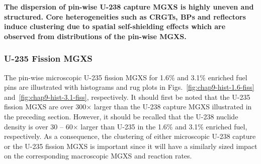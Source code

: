 
\begin{emphbox}
\textbf{The dispersion of pin-wise U-238 capture \ac{MGXS} is highly uneven and structured. Core heterogeneities such as \acp{CRGT}, \acp{BP} and reflectors induce clustering due to spatial self-shielding effects which are observed from distributions of the pin-wise \ac{MGXS}.}
\end{emphbox}

\subsubsection{U-235 Fission MGXS}
\label{subsubsec:chap9-histograms-fiss}

The pin-wise microscopic U-235 fission \ac{MGXS} for 1.6\% and 3.1\% enriched fuel pins are illustrated with histograms and rug plots in Figs.~\ref{fig:chap9-hist-1.6-fiss} and~\ref{fig:chap9-hist-3.1-fiss}, respectively. It should first be noted that the U-235 fission \ac{MGXS} are over 300$\times$ larger than the U-238 capture \ac{MGXS} illustrated in the preceding section. However, it should be recalled that the U-238 nuclide density is over 30 -- 60$\times$ larger than U-235 in the 1.6\% and 3.1\% enriched fuel, respectively. As a consequence, the clustering of either microscopic U-238 capture or the U-235 fission \ac{MGXS} is important since it will have a similarly sized impact on the corresponding macroscopic \ac{MGXS} and reaction rates.

